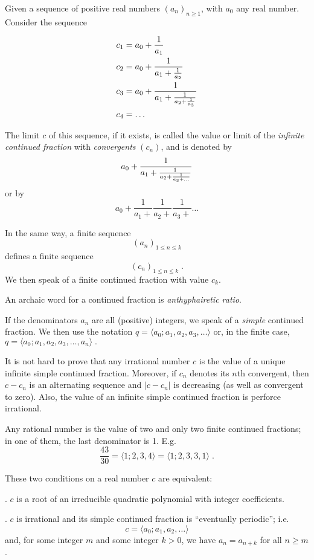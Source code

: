\documentclass[12pt]{article}
\begin{document}
Given a sequence of positive real numbers $(a_n)_{n \ge 1}$, with $a_0$ any real number. Consider the sequence

\begin{align*}
c_1&=a_0+\frac{1}{a_1}\\
c_2&=a_0+\frac{1}{a_1+\frac{1}{a_2}}\\
c_3&=a_0+\frac{1}{a_1+\frac{1}{a_2+\frac{1}{a_3}}}\\
c_4&=\ldots
\end{align*}

The limit $c$ of this sequence, if it exists, is called the value or limit of the \emph{infinite continued fraction} with \emph{convergents} $(c_n)$, and is denoted by $$a_0 + \frac{1}{a_1 + \frac{1}{a_2 + \frac{1}{a_3 + \ldots}}}$$ or by $$a_{0} + \frac{1}{a_{1} + }\frac{1}{a_{2} + }\frac{1}{a_{3} + }\ldots$$

In the same way, a finite sequence $$(a_n)_{1\le n\le k}$$ defines a finite sequence $$(c_n)_{1\le n\le k}\;.$$ We then speak of a finite continued fraction with value $c_k$.

An archaic word for a continued fraction is \emph{anthyphairetic ratio}.

If the denominators $a_n$ are all (positive) integers, we speak of a \emph{simple} continued fraction. We then use the notation $q = \langle a_0; a_1, a_2, a_3,\ldots \rangle $ or, in the finite case, $q = \langle a_0; a_1, a_2, a_3, \ldots , a_n \rangle \;.$

It is not hard to prove that any irrational number $c$ is the value of a unique infinite simple continued fraction. Moreover, if $c_n$ denotes its $n$th convergent, then $c-c_n$ is an alternating sequence and $|c - c_n|$ is decreasing (as well as convergent to zero). Also, the value of an infinite simple continued fraction is perforce
irrational.

Any rational number is the value of two and only two finite continued fractions; in one of them, the last denominator is 1. E.g. $$\frac{43}{30} = \langle 1;2,3,4 \rangle = \langle 1;2,3,3,1 \rangle \;.$$

These two conditions on a real number $c$ are equivalent:

. $c$ is a root of an irreducible quadratic polynomial with
integer coefficients.

. $c$ is irrational and its simple
continued fraction is ``eventually periodic''; i.e.
$$c=\langle a_0;a_1,a_2,\ldots\rangle$$
and, for some integer $m$ and some integer $k>0$, we have $a_n=a_{n+k}$
for all $n\ge m$.
\end{document}
